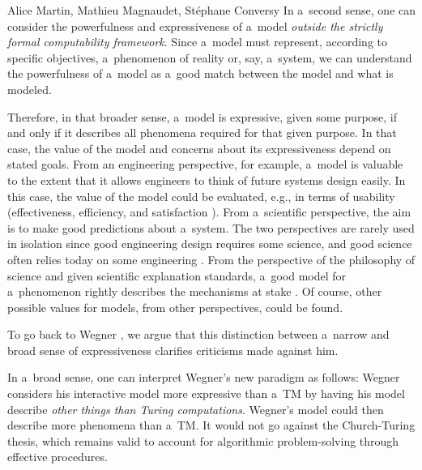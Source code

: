 \begin{artengenv2auth}{Alice Martin, Mathieu Magnaudet, Stéphane Conversy}
In a~second sense, one can consider the powerfulness and expressiveness of a~model \textit{outside the strictly formal computability framework}. Since a~model must represent, according to specific objectives, a~phenomenon of reality or, say, a~system, we can understand the powerfulness of a~model as a~good match between the model and what is modeled. 

Therefore, in that broader sense, a~model is expressive, given some purpose, if and only if it describes all phenomena required for that given purpose. In that case, the value of the model and concerns about its expressiveness depend on stated goals. 
From an engineering perspective, for example, a~model is valuable to the extent that it allows engineers to think of future systems design easily. In this case, the value of the model could be evaluated, e.g., in terms of usability (effectiveness, efficiency, and satisfaction \parencite{ISO2018}). From a~scientific perspective, the aim is to make good predictions about a~system. The two perspectives are rarely used in isolation since good engineering design requires some science, and good science often relies today on some engineering \parencite{Lee2016}.
From the perspective of the philosophy of science and given scientific explanation standards, a~good model for a~phenomenon rightly describes the mechanisms at stake \parencite{Glennan2002, Machamer2000, Mikowski2016}. Of course, other possible values for models, from other perspectives, could be found.



To go back to Wegner \parencite{Wegner1995, Wegner1997, Wegner1998, Goldin2000}, we argue that this distinction between a~narrow and broad sense of expressiveness clarifies criticisms made against him. 

In a~broad sense, one can interpret Wegner's new paradigm as follows: Wegner considers his interactive model more expressive than a~TM by having his model describe \textit{other things than Turing computations}. Wegner's model could then describe more phenomena than a~TM. 
It would not go against the Church-Turing thesis, which remains valid to account for algorithmic problem-solving through effective procedures.


\end{artengenv2auth}
